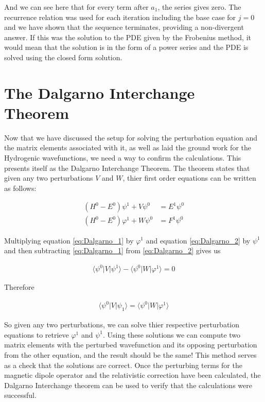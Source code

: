         And we can see here that for every term after $a_1$, the series gives zero. The recurrence relation was used for each iteration including the base case for $j = 0$ and we have shown that the sequence terminates, providing a non-divergent answer. If this was the solution to the PDE given by the Frobenius method, it would mean that the solution is in the form of a power series and the PDE is solved using the closed form solution.

    \section{The Dalgarno Interchange Theorem} \label{sec:Dalgarno_Interchange_Theorem}
        Now that we have discussed the setup for solving the perturbation equation and the matrix elements associated with it, as well as laid the ground work for the Hydrogenic wavefunctions, we need a way to confirm the calculations. This presents itself as the Dalgarno Interchange Theorem. The theorem states that given any two perturbations $V$ and $W$, thier first order equations can be written as follows:

        \begin{align}
            \left( H^0 - E^0 \right) \psi^1 + V \psi^0 &= E^1 \psi^0 \label{eq:Dalgarno_1}\\
            \left( H^0 - E^0 \right) \varphi^1 + W \psi^0 &= F^1 \psi^0 \label{eq:Dalgarno_2}
        \end{align}

        Multiplying equation \eqref{eq:Dalgarno_1} by $\varphi^1$ and equation \eqref{eq:Dalgarno_2} by $\psi^1$ and then subtracting \eqref{eq:Dalgarno_1} from \eqref{eq:Dalgarno_2} gives us

        \begin{align}
            \langle \psi^0 \vert V \vert \psi^1 \rangle - \langle \psi^0 \vert W \vert \varphi^1 \rangle = 0
        \end{align}

        Therefore 

        \begin{align}
            \langle \psi^0 \vert V \vert \psi_1 \rangle = \langle \psi^0 \vert W \vert \varphi^1 \rangle
        \end{align}

        So given any two perturbations, we can solve thier respective perturbation equations to retrieve $\varphi^1$ and $\psi^1$. Using these solutions we can compute two matrix elements with the perturbed wavefunction and its opposing perturbation from the other equation, and the result should be the same! This method serves as a check that the solutions are correct. Once the perturbing terms for the magnetic dipole operator and the relativistic correction have been calculated, the Dalgarno Interchange theorem can be used to verify that the calculations were successful.
    
    